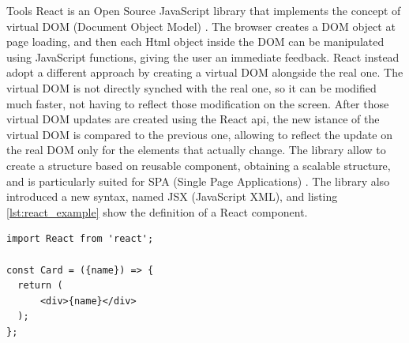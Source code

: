 \begin{chapter}{Tools}
    React is an Open Source JavaScript library that implements the concept of
    virtual DOM (Document Object Model) \cite{dom_standard}. The browser creates
    a DOM object at page loading, and then each Html object inside the DOM can be
    manipulated using JavaScript functions, giving the user an immediate feedback.
    React instead adopt a different approach by creating a virtual DOM alongside
    the real one. The virtual DOM is not directly synched with the real one, so
    it can be modified much faster, not having to reflect those modification on
    the screen. After those virtual DOM updates are created using the React api,
    the new istance of the virtual DOM is compared to the previous one, allowing
    to reflect the update on the real DOM only for the elements that actually
    change. The library allow to create a structure based on reusable component,
    obtaining a scalable structure, and is particularly suited for SPA (Single
    Page Applications) \cite{react_js}.
    The library also introduced a new syntax, named JSX (JavaScript XML), and
    listing \ref{lst:react_example} show the definition of a React component.

    \bigskip
    \begin{lstlisting}[caption= React component definition,label={lst:react_example}]
import React from 'react';

const Card = ({name}) => {
  return (
      <div>{name}</div>
  );
};
    \end{lstlisting}

\end{chapter}